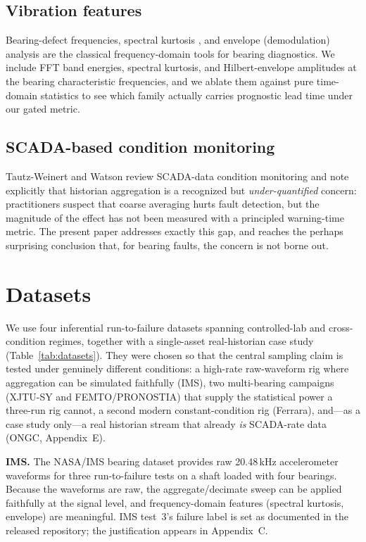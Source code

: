 \documentclass[journal]{IEEEtran}
\begin{document}
\subsection{Vibration features}
Bearing-defect frequencies, spectral kurtosis \cite{antoni2006}, and envelope
(demodulation) analysis \cite{randall2011} are the classical frequency-domain
tools for bearing diagnostics. We include FFT band energies,
spectral kurtosis, and Hilbert-envelope amplitudes at the bearing
characteristic frequencies, and we ablate them against pure time-domain
statistics to see which family actually carries prognostic lead time under our
gated metric.

\subsection{SCADA-based condition monitoring}
Tautz-Weinert and Watson \cite{tautz2017} review SCADA-data condition
monitoring and note explicitly that historian aggregation is a recognized but
\emph{under-quantified} concern: practitioners suspect that coarse averaging
hurts fault detection, but the magnitude of the effect has not been measured
with a principled warning-time metric. The present paper addresses exactly this
gap, and reaches the perhaps surprising conclusion that, for bearing faults,
the concern is not borne out.

\section{Datasets}

We use four inferential run-to-failure datasets spanning controlled-lab and
cross-condition regimes, together with a single-asset real-historian case study
(Table~\ref{tab:datasets}). They were chosen so that the central sampling claim
is tested under genuinely different conditions: a high-rate raw-waveform rig
where aggregation can be simulated faithfully (IMS), two multi-bearing campaigns
(XJTU-SY and FEMTO/PRONOSTIA) that supply the statistical power a three-run rig
cannot, a second modern constant-condition rig (Ferrara), and---as a case study
only---a real historian stream that already \emph{is} SCADA-rate data (ONGC,
Appendix~E).

\textbf{IMS.} The NASA/IMS bearing dataset \cite{qiu2006} provides raw
20.48\,kHz accelerometer waveforms for three run-to-failure tests on a shaft
loaded with four bearings. Because the waveforms are raw, the aggregate/decimate
sweep can be applied faithfully at the signal level, and frequency-domain
features (spectral kurtosis, envelope) are meaningful. IMS test~3's failure label is set as documented in the released repository; the
justification appears in Appendix~C.
\end{document}
